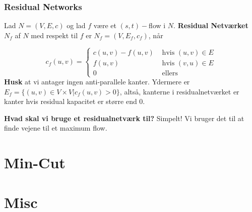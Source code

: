 \documentclass[11pt]{article}
\theoremstyle{definition}
\theoremstyle{remark}
\begin{document}
\subsubsection{Residual Networks}
\label{subsub:residual}

Lad $N = (V,E,c)$ og lad $f$ være et $(s,t)-$flow i $N$. \textbf{Residual Netværket} $N_{f}$ af $N$ med respekt til $f$ er $N_{f} = (V, E_f, c_{f})$, når

\[
c_{f}(u,v) = \begin{cases}
  c(u,v) - f(u,v) & \text{ hvis } (u,v) \in E\\
  f(u,v) & \text{ hvis }(v,u) \in E\\
  0 & \text{ ellers}
\end{cases}
\]
\textbf{Husk} at vi antager ingen anti-parallele kanter. 
Ydermere er $E_{f} = \{(u,v) \in V \times V | c_{f}(u,v) > 0\}$, altså, kanterne i residualnetværket er kanter hvis residual kapacitet er større end 0.

\textbf{Hvad skal vi bruge et residualnetværk til?} Simpelt! Vi bruger det til at finde vejene til et maximum flow.

\section{Min-Cut}
\label{sec:mincut}

\section{Misc}
\label{sec:misc}
\end{document}
